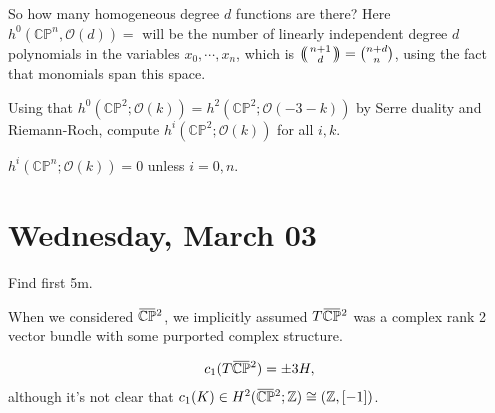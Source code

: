 \begin{remark}

So how many homogeneous degree \(d\) functions are there? Here
\(h^0({\mathbb{CP}}^n, {\mathcal{O}}(d)) =\) will be the number of
linearly independent degree \(d\) polynomials in the variables
\(x_0, \cdots, x_n\), which is
\({\left(\kern-.3em\left(\genfrac{}{}{0pt}{}{n+1}{d}\right)\kern-.3em\right)} = {n + d\choose n}\),
using the fact that monomials span this space.

\end{remark}

\begin{exercise}[?]

Using that
\(h^0({\mathbb{CP}}^2; {\mathcal{O}}(k))= h^2({\mathbb{CP}}^2; {\mathcal{O}}(-3-k) )\)
by Serre duality and Riemann-Roch, compute
\(h^i({\mathbb{CP}}^2; {\mathcal{O}}(k))\) for all \(i, k\).

\end{exercise}

\begin{fact}

\(h^i({\mathbb{CP}}^n; {\mathcal{O}}(k)) = 0\) unless \(i=0, n\).

\end{fact}

\hypertarget{wednesday-march-03}{%
\section{Wednesday, March 03}\label{wednesday-march-03}}

Find first 5m.

\begin{remark}

When we considered
\(\mkern 1.5mu\overline{\mkern-1.5mu{\mathbb{CP}}\mkern-1.5mu}\mkern 1.5mu^2\),
we implicitly assumed
\(T\mkern 1.5mu\overline{\mkern-1.5mu{\mathbb{CP}}\mkern-1.5mu}\mkern 1.5mu^2\)
was a complex rank 2 vector bundle with some purported complex
structure.

\end{remark}

\begin{claim}

\begin{align*}
c_1( T\mkern 1.5mu\overline{\mkern-1.5mu{\mathbb{CP}}\mkern-1.5mu}\mkern 1.5mu^2) = \pm 3H
,\end{align*}
although it's not clear that
\(c_1(K) \in H^2( \mkern 1.5mu\overline{\mkern-1.5mu{\mathbb{CP}}\mkern-1.5mu}\mkern 1.5mu^2; {\mathbb{Z}}) \cong ({\mathbb{Z}}, [-1] )\).

\end{claim}

